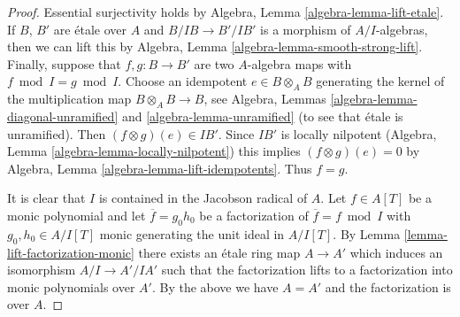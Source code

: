 \documentclass[10pt,a4paper]{amsart}
\theoremstyle{plain}
\theoremstyle{definition}
\theoremstyle{remark}
\numberwithin{equation}{subsection}
\begin{document}
\begin{proof}
Essential surjectivity holds by Algebra, Lemma \ref{algebra-lemma-lift-etale}.
If $B$, $B'$ are \'etale over $A$ and $B/IB \to B'/IB'$ is a morphism
of $A/I$-algebras, then we can lift this by
Algebra, Lemma \ref{algebra-lemma-smooth-strong-lift}.
Finally, suppose that $f, g : B \to B'$ are two $A$-algebra
maps with $f \bmod I = g \bmod I$. Choose an idempotent $e \in B \otimes_A B$
generating the kernel of the multiplication map $B \otimes_A B \to B$,
see Algebra, Lemmas \ref{algebra-lemma-diagonal-unramified}
and \ref{algebra-lemma-unramified} (to see that \'etale is unramified).
Then $(f \otimes g)(e) \in IB'$. Since $IB'$ is locally nilpotent
(Algebra, Lemma \ref{algebra-lemma-locally-nilpotent}) this implies
$(f \otimes g)(e) = 0$ by Algebra, Lemma \ref{algebra-lemma-lift-idempotents}.
Thus $f = g$.

\medskip\noindent
It is clear that $I$ is contained in the Jacobson radical of $A$.
Let $f \in A[T]$ be a monic polynomial and let
$\overline{f} = g_0h_0$ be a factorization
of $\overline{f} = f \bmod I$ with $g_0, h_0 \in A/I[T]$ monic
generating the unit ideal in $A/I[T]$. By
Lemma \ref{lemma-lift-factorization-monic}
there exists an \'etale ring map $A \to A'$ which
induces an isomorphism $A/I \to A'/IA'$ such that
the factorization lifts to a factorization into monic polynomials
over $A'$. By the above we have $A = A'$ and the factorization
is over $A$.
\end{proof}
\end{document}
